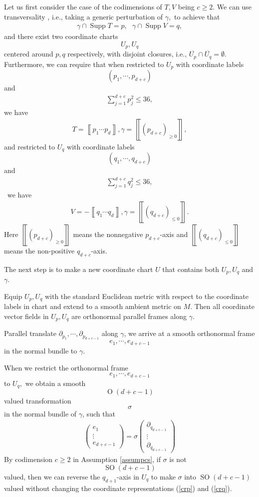 \documentclass[11pt,a4paper]{amsart}
\numberwithin{equation}{section}
\newcommand{\supp}{\operatorname{Supp}}
\newcommand{\es}{\emptyset}
\newcommand{\ga}{\gamma}
\newcommand{\e}{\epsilon}
\newcommand{\si}{\sigma}
\newcommand{\cd}{\cdots}
\newcommand{\ov}[1]{\overline{#1}}
\newcommand{\cu}[1]{\left\llbracket#1\right\rrbracket}
\newcommand{\pd}{\partial}
\theoremstyle{plain}
\theoremstyle{definition}
\numberwithin{equation}{subsection}
\begin{document}
	Let us first consider the case of the codimensions of $T,V$ being $c\ge2$. We can use transversality \cite{MH}, i.e., taking a generic perturbation of $\ga,$ to achieve that\begin{align*}
		\ga\cap\supp T=p,\text{ }\ga\cap\supp V=q,
	\end{align*}and there exist two coordinate charts $$U_p,U_q$$ centered around $p,q$ respectively, with disjoint closures, i.e., $\ov{U_p}\cap\ov{U_q}=\es.$ Furthermore, we can require that when restricted to $U_p$ with coordinate labels $$(p_1,\cd,p_{d+c})$$and
	\begin{align*}
		\sum_{j=1}^{d+c} p_j^2\le 36,
	\end{align*} we have\begin{align}\label{crp}
		T=\cu{p_1\cd p_d},\ga=\cu{(p_{d+c})_{\ge0}},
	\end{align} and restricted to $U_q$ with coordinate labels $$(q_1,\cd,q_{d+c})$$and\begin{align*}
		\sum_{j=1}^{d+c} q_j^2\le 36,
	\end{align*}  we have\begin{align}\label{crq}
		V=-\cu{q_1\cd q_d},\ga=\cu{(q_{d+c})_{\le0}}.
	\end{align}
	Here $\cu{(p_{d+c})_{\ge0}}$ means the nonnegative $p_{d+c}$-axis and $\cu{(q_{d+c})_{\le0}}$ means the non-positive $q_{d+c}$-axis.
	
	The next step is to make a new coordinate chart $U$ that contains both $U_p,U_q$ and $\ga.$
	
	Equip $U_p,U_q$ with the standard Euclidean metric with respect to the coordinate labels in chart and extend to a smooth ambient metric on $M.$ Then all coordinate vector fields in $U_p,U_q$ are orthonormal parallel frames along $\ga.$ 
	
	Parallel translate $\pd_{p_1},\cd,\pd_{p_{d+c-1}}$ along $\ga$, we arrive at a smooth orthonormal frame $$e_1,\cd,e_{d+c-1}$$ in the normal bundle to $\ga$.
	
	When we restrict the orthonormal frame $$e_1,\cd,e_{d+c-1}$$ to $U_q,$ we obtain a smooth $$\operatorname{O}(d+c-1)$$valued transformation $$\si$$ in the normal bundle of $\ga$, such that
	\begin{align}\label{rotfm}
		\begin{pmatrix}
			e_1\\\vdots \\e_{d+c-1}
		\end{pmatrix}=\si 
		\begin{pmatrix}
			\pd_{q_{d+c-1}}\\\vdots \\\pd_{q_{d+c-1}}
		\end{pmatrix}
	\end{align}
	By codimension $c\ge 2$ in Assumption \ref{assumpcs}, if $\si$ is not  $$\operatorname{SO}(d+c-1)$$valued, then we can reverse the $q_{d+1}$-axis in $U_q$ to make $\si$ into $\operatorname{SO}(d+c-1)$ valued without changing the coordinate representations (\ref{crp}) and (\ref{crq}).
	
\end{document}
